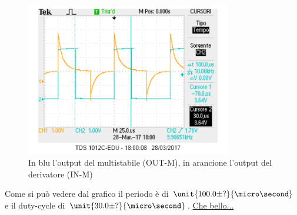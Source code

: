 \documentclass[a4paper,10pt]{article}
\begin{document}
 \begin{figure}[H]
	\centering
	\includegraphics[width=0.8\textwidth]{../grafici/410030.png}
	\caption{In blu l'output del multistabile (OUT-M), in arancione l'output del derivatore (IN-M)}
	\label{fig:410030}
\end{figure}

Come si può vedere dal grafico il periodo è di $\unit{100.0 \pm ?}{\micro\second}$ e il duty-cycle di $\unit{30.0 \pm ?}{\micro\second}$.
\underline{Che bello...}
\end{document}
